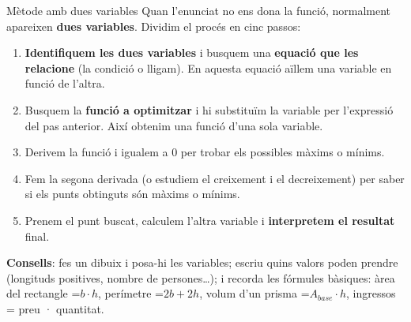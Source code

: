 \documentclass[11pt,a4paper]{article}
\newcommand{\fmm}[1]{\setbox0=\hbox{$#1$}\ifdim\wd0>\linewidth\[#1\]\else\mbox{\box0}\fi}
\newcommand{\fmuline}[1]{\textbf{\color{fmaccent}#1}}
\begin{document}
  
\begin{fmdef}{Mètode amb dues variables}
Quan l'enunciat no ens dona la funció, normalment apareixen \textbf{dues variables}. Dividim el procés en cinc passos:

      
\begin{enumerate}
\item \textbf{Identifiquem les dues variables} i busquem una \textbf{equació que les relacione} (la condició o lligam). En aquesta equació aïllem una variable en funció de l'altra.
\item Busquem la \textbf{funció a optimitzar} i hi substituïm la variable per l'expressió del pas anterior. Així obtenim una funció d'una sola variable.
\item Derivem la funció i igualem a 0 per trobar els possibles màxims o mínims.
\item Fem la segona derivada (o estudiem el creixement i el decreixement) per saber si els punts obtinguts són màxims o mínims.
\item Prenem el punt buscat, calculem l'altra variable i \textbf{interpretem el resultat} final.
\end{enumerate}

      
\begin{fmnote}\fmuline{Consells}: fes un dibuix i posa-hi les variables; escriu quins valors poden prendre (longituds positives, nombre de persones\dots{}); i recorda les fórmules bàsiques: àrea del rectangle \fmm{b\cdot h}, perímetre \fmm{2b+2h}, volum d'un prisma \fmm{A_{base}\cdot h}, ingressos = preu · quantitat.\end{fmnote}
\end{fmdef}
\end{document}
